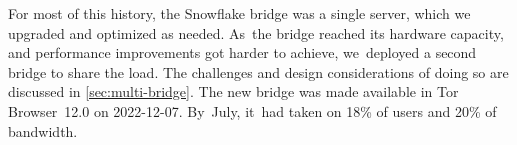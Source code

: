 \documentclass[letterpaper,twocolumn]{article}
\begin{document}
For most of this history,
the Snowflake bridge was a single server,
which we upgraded and optimized as needed.
As~the bridge reached its hardware capacity,
and performance improvements got harder to achieve,
we~deployed a second bridge to share the load.
The challenges and design considerations of doing so are discussed in \autoref{sec:multi-bridge}.
The new bridge was made available in
Tor Browser~12.0 on \mbox{2022-12-07}.
By~July, it~had taken on
18\% of users and
20\% of bandwidth.
\end{document}
